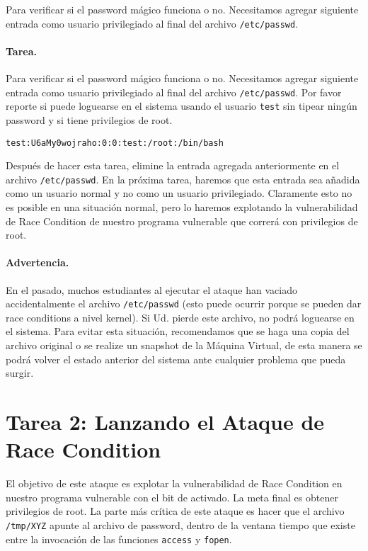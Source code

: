 Para verificar si el password mágico funciona o no. Necesitamos agregar siguiente  entrada como usuario privilegiado al final del archivo \texttt{/etc/passwd}.
\paragraph{Tarea.} Para verificar si el password mágico funciona o no. Necesitamos agregar siguiente  entrada como usuario privilegiado al final del archivo \texttt{/etc/passwd}.
Por favor reporte si puede loguearse en el sistema usando el usuario  \texttt{test} sin tipear ningún password y si tiene privilegios de root.

\begin{lstlisting}
test:U6aMy0wojraho:0:0:test:/root:/bin/bash
\end{lstlisting}

Después de hacer esta tarea, elimine la entrada agregada anteriormente en el archivo \texttt{/etc/passwd}. En la próxima tarea, haremos que esta entrada sea añadida como un usuario normal y no como un usuario privilegiado. Claramente esto no es posible en una situación normal, pero lo haremos explotando la vulnerabilidad de Race Condition de nuestro programa vulnerable que correrá con privilegios de root.


\paragraph{Advertencia.}
En el pasado, muchos estudiantes al ejecutar el ataque han vaciado accidentalmente el archivo {\tt /etc/passwd} (esto puede ocurrir porque se pueden dar race conditions a nivel kernel). Si Ud. pierde este archivo, no podrá loguearse en el sistema. Para evitar esta situación, recomendamos que se haga una copia del archivo original o se realize un snapshot de la Máquina Virtual, de esta manera se podrá volver el estado anterior del sistema ante cualquier problema que pueda surgir.



\section{Tarea 2: Lanzando el Ataque de Race Condition}

El objetivo de este ataque es explotar la vulnerabilidad de Race Condition en nuestro programa vulnerable con el bit de \setuid activado. La meta final es obtener privilegios de root. La parte más crítica de este ataque es hacer que el archivo \texttt{/tmp/XYZ} apunte al archivo de password, dentro de la ventana tiempo que existe entre la invocación de las funciones \texttt{access} y \texttt{fopen}.

